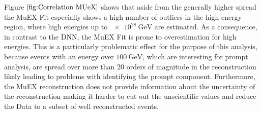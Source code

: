 \documentclass[
  tucolor,       %
  BCOR=12mm,     %
  parskip=half,  %
  open=any,      %
  cleardoublepage=plain,  %
]{tudothesis}
\begin{document}
Figure $\ref{fig:Correlation MUeX}$ shows that aside from the generally higher spread the MuEX Fit especially shows a high number of outliers in the high energy region, where high energies up to $\SI{e28}{\giga\electronvolt}$ are estimated. 
As a consequence, in contrast to the DNN, the MuEX Fit is prone to overestimation for high energies.
This is a particularly problematic effect for the purpose of this analysis, because events with an energy over $\SI{100}{\giga\electronvolt}$, which are interesting for prompt analysis, are spread over more than $20$ orders of magnitude in the reconstruction likely leading to problems with identifying the prompt component.
Furthermore, the MuEX reconstruction does not provide information about the uncertainty of the reconstruction making it harder to cut out the unscientific values and reduce the Data to a subset of well reconstructed events.
\end{document}
